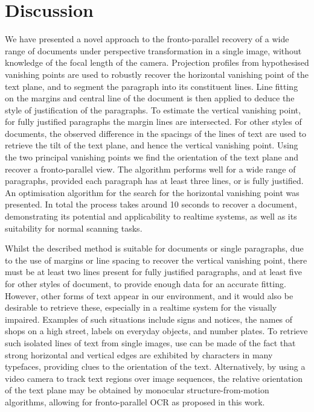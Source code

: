 \documentclass{article}
\begin{document}
% 






\section{Discussion}
\label{conclusions}

We have presented a novel approach to the fronto-parallel recovery of a wide range of documents under perspective transformation in a single image, without knowledge of the focal length of the camera.
Projection profiles from hypothesised vanishing points are used to robustly recover the horizontal vanishing point of the text plane, and to segment the paragraph into its constituent lines.
Line fitting on the margins and central line of the document is then applied to deduce the style of justification of the paragraphs.
To estimate the vertical vanishing point, for fully justified paragraphs the margin lines are intersected.
For other styles of documents, the observed difference in the spacings of the lines of text are used to retrieve the tilt of the text plane, and hence the vertical vanishing point.
Using the two principal vanishing points we find the orientation of the text plane and recover a fronto-parallel view.
The algorithm performs well for a wide range of paragraphs, provided each paragraph has at least three lines, or is fully justified.
An optimisation algorithm for the search for the horizontal vanishing point was presented.
In total the process takes around 10 seconds to recover a document, demonstrating its potential and applicability to realtime systems, as well as its suitability for normal scanning tasks.

Whilst the described method is suitable for documents or single paragraphs, due to the use of margins or line spacing to recover the vertical vanishing point, there must be at least two lines present for fully justified paragraphs, and at least five for other styles of document, to provide enough data for an accurate fitting.
However, other forms of text appear in our environment, and it would also be desirable to retrieve these, especially in a realtime system for the visually impaired.
Examples of such situations include signs and notices, the names of shops on a high street, labels on everyday objects, and number plates.
To retrieve such isolated lines of text from single images,
use can be made of the fact that strong horizontal and vertical edges are exhibited by characters in many typefaces, providing clues to the orientation of the text.
Alternatively, by using a video camera to track text regions over image sequences, the relative orientation of the text plane may be obtained by monocular structure-from-motion algorithms, allowing for fronto-parallel OCR as proposed in this work.
\end{document}
